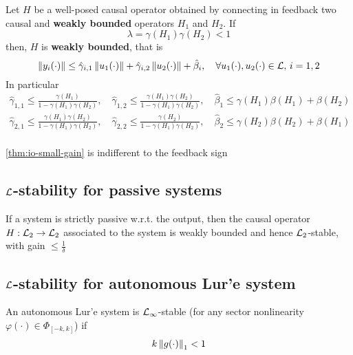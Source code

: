 \begin{theorem}\label{thm:io-small-gain}
	Let $H$ be a well-posed causal operator obtained by connecting in feedback two causal and \textbf{weakly bounded} operators $H_1$ and $H_2$.
	If
	\[
		\lambda = \gamma(H_1)\gamma(H_2) < 1
	\]
	then, $H$ is \textbf{weakly bounded}, that is
	\[
		\left\lVert y_i(\cdot)\right\rVert \leq \hat\gamma_{i,1} \left\lVert u_1(\cdot)\right\rVert + \hat\gamma_{i,2} \left\lVert u_2(\cdot)\right\rVert + \hat\beta_i, \quad \forall u_1(\cdot),u_2(\cdot) \in \mathcal{L},\, i = 1,2
	\]
	In particular
	\begin{gather*}
	    \hat\gamma_{1,1} \leq \frac{\gamma(H_1)}{1-\gamma(H_1)\gamma(H_2)}, \quad
	    \hat\gamma_{1,2} \leq \frac{\gamma(H_1)\gamma(H_2)}{1-\gamma(H_1)\gamma(H_2)}, \quad
		\hat\beta_1 \leq \gamma(H_1) \beta(H_1) + \beta(H_2) \\
	    \hat\gamma_{2,1} \leq \frac{\gamma(H_1)\gamma(H_2)}{1-\gamma(H_1)\gamma(H_2)}, \quad
	    \hat\gamma_{2,2} \leq \frac{\gamma(H_2)}{1-\gamma(H_1)\gamma(H_2)}, \quad
	    \hat\beta_2 \leq \gamma(H_2) \beta(H_2) + \beta(H_1) \\
	\end{gather*}
\end{theorem}

\begin{nb}\cref{thm:io-small-gain} is indifferent to the feedback sign\end{nb}

\subsection{$\mathcal{L}$-stability for passive systems}

\begin{theorem}
	If a system is strictly passive w.r.t. the output, then the causal operator $H : \mathcal{L}_2 \to \mathcal{L}_2$ associated to the system is weakly bounded and hence $\mathcal{L}_2$-stable, with gain $\leq \frac{1}{\delta}$
\end{theorem}

\subsection{$\mathcal{L}$-stability for autonomous Lur'e system}

\begin{theorem}
An autonomous Lur'e system is $\mathcal{L}_\infty$-stable (for any sector nonlinearity $\varphi(\cdot) \in \Phi_{[-k, k]}$) if
\[k \left\lVert g(\cdot)\right\rVert_1 < 1\]
\end{theorem}

